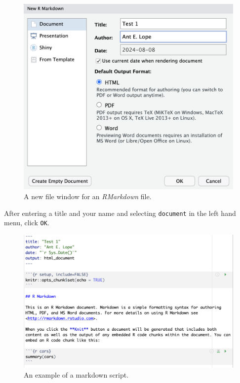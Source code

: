 \documentclass[
  letterpaper,
  DIV=11,
  numbers=noendperiod]{scrreprt}
\begin{document}
\begin{figure}[H]

{\centering \includegraphics{images/newfile.png}

}

\caption{A new file window for an \emph{RMarkdown} file.}

\end{figure}%

After entering a title and your name and selecting \texttt{document} in
the left hand menu, click \texttt{OK}.

\begin{figure}[H]

{\centering \includegraphics{images/markdown.png}

}

\caption{An example of a markdown script.}

\end{figure}%
\end{document}
